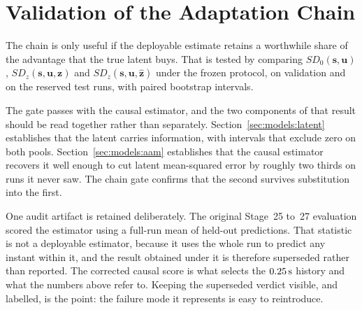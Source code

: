 \section{Validation of the Adaptation Chain}
\label{sec:models:chain}
The chain is only useful if the deployable estimate retains a worthwhile share
of the advantage that the true latent buys. That is tested by comparing
$SD_0(\bm{s},\bm{u})$, $SD_z(\bm{s},\bm{u},\bm{z})$ and
$SD_z(\bm{s},\bm{u},\hat{\bm{z}})$ under the frozen protocol, on validation and
on the reserved test runs, with paired bootstrap intervals.

The gate passes with the causal estimator, and the two components of that
result should be read together rather than separately. Section~\ref{sec:models:latent}
establishes that the latent carries information, with intervals that exclude
zero on both pools. Section~\ref{sec:models:aam} establishes that the causal
estimator recovers it well enough to cut latent mean-squared error by roughly
two thirds on runs it never saw. The chain gate confirms that the second
survives substitution into the first.

One audit artifact is retained deliberately. The original Stage~25 to~27
evaluation scored the estimator using a full-run mean of held-out predictions.
That statistic is not a deployable estimator, because it uses the whole run to
predict any instant within it, and the result obtained under it is therefore
superseded rather than reported. The corrected causal score is what selects the
$\unit[0.25]{s}$ history and what the numbers above refer to. Keeping the
superseded verdict visible, and labelled, is the point: the failure mode it
represents is easy to reintroduce.


